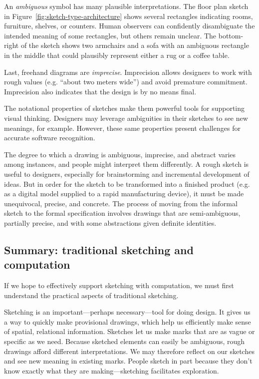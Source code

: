 An \textit{ambiguous} symbol has many plausible interpretations. The
floor plan sketch in Figure~\ref{fig:sketch-type-architecture} shows
several rectangles indicating rooms, furniture, shelves, or
counters. Human observers can confidently disambiguate the intended
meaning of some rectangles, but others remain unclear. The
bottom-right of the sketch shows two armchairs and a sofa with an
ambiguous rectangle in the middle that could plausibly represent
either a rug or a coffee table.

Last, freehand diagrams are \textit{imprecise}. Imprecision allows
designers to work with rough values (e.g. ``about two meters wide'')
and avoid premature commitment. Imprecision also indicates that the
design is by no means final.

The notational properties of sketches make them powerful tools for
supporting visual thinking. Designers may leverage ambiguities in
their sketches to see new meanings, for example. However, these same
properties present challenges for accurate software recognition.

The degree to which a drawing is ambiguous, imprecise, and abstract
varies among instances, and people might interpret them differently. A
rough sketch is useful to designers, especially for brainstorming and
incremental development of ideas. But in order for the sketch to be
transformed into a finished product (e.g. as a digital model supplied
to a rapid manufacturing device), it must be made unequivocal,
precise, and concrete. The process of moving from the informal sketch
to the formal specification involves drawings that are semi-ambiguous,
partially precise, and with some abstractions given definite
identities.

\subsection{Summary: traditional sketching and computation}
\label{ref:traditional-summary}

If we hope to effectively support sketching with computation, we must
first understand the practical aspects of traditional sketching. 

Sketching is an important---perhaps necessary---tool for doing
design. It gives us a way to quickly make provisional drawings, which
help us efficiently make sense of spatial, relational
information. Sketches let us make marks that are as vague or specific
as we need. Because sketched elements can easily be ambiguous, rough
drawings afford different interpretations. We may therefore reflect on
our sketches and see new meaning in existing marks. People sketch in
part because they don't know exactly what they are making---sketching
facilitates exploration.

